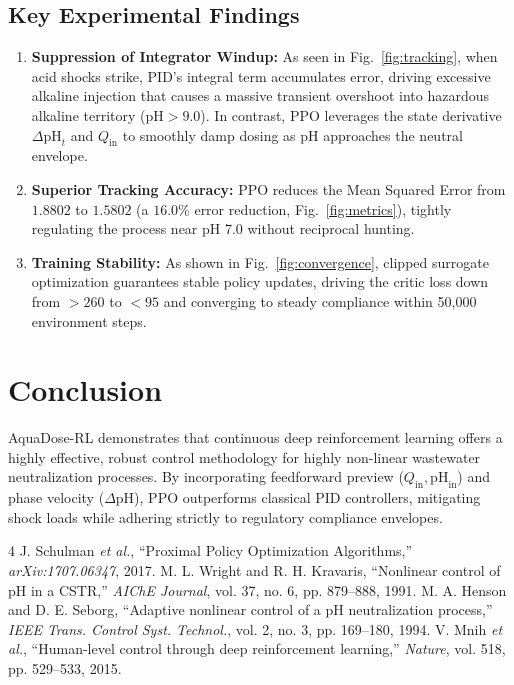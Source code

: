 \documentclass[10pt,twocolumn,a4paper]{article}
\begin{document}
\subsection{Key Experimental Findings}
\begin{enumerate}
    \item \textbf{Suppression of Integrator Windup:} As seen in Fig.~\ref{fig:tracking}, when acid shocks strike, PID's integral term accumulates error, driving excessive alkaline injection that causes a massive transient overshoot into hazardous alkaline territory ($\text{pH} > 9.0$). In contrast, PPO leverages the state derivative $\Delta \text{pH}_t$ and $Q_{\text{in}}$ to smoothly damp dosing as pH approaches the neutral envelope.
    \item \textbf{Superior Tracking Accuracy:} PPO reduces the Mean Squared Error from $1.8802$ to $1.5802$ (a $16.0\%$ error reduction, Fig.~\ref{fig:metrics}), tightly regulating the process near pH 7.0 without reciprocal hunting.
    \item \textbf{Training Stability:} As shown in Fig.~\ref{fig:convergence}, clipped surrogate optimization guarantees stable policy updates, driving the critic loss down from $>260$ to $<95$ and converging to steady compliance within 50,000 environment steps.
\end{enumerate}

\section{Conclusion}
AquaDose-RL demonstrates that continuous deep reinforcement learning offers a highly effective, robust control methodology for highly non-linear wastewater neutralization processes. By incorporating feedforward preview ($Q_{\text{in}}, \text{pH}_{\text{in}}$) and phase velocity ($\Delta \text{pH}$), PPO outperforms classical PID controllers, mitigating shock loads while adhering strictly to regulatory compliance envelopes.

\small
\begin{thebibliography}{4}
 J. Schulman \emph{et al.}, ``Proximal Policy Optimization Algorithms,'' \emph{arXiv:1707.06347}, 2017.
 M. L. Wright and R. H. Kravaris, ``Nonlinear control of pH in a CSTR,'' \emph{AIChE Journal}, vol. 37, no. 6, pp. 879--888, 1991.
 M. A. Henson and D. E. Seborg, ``Adaptive nonlinear control of a pH neutralization process,'' \emph{IEEE Trans. Control Syst. Technol.}, vol. 2, no. 3, pp. 169--180, 1994.
 V. Mnih \emph{et al.}, ``Human-level control through deep reinforcement learning,'' \emph{Nature}, vol. 518, pp. 529--533, 2015.
\end{thebibliography}
\end{document}
